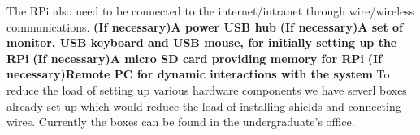 \documentclass{article}
\begin{document}
The RPi also need to be connected to the internet/intranet through wire/wireless communications. \newline\newline
\textbf{(If necessary)A power USB hub}\newline
\textbf{(If necessary)A set of monitor, USB keyboard and USB mouse, for initially setting up the RPi}\newline
\textbf{(If necessary)A micro SD card providing memory for RPi}\newline
\textbf{(If necessary)Remote PC for dynamic interactions with the system}\newline\newline
To reduce the load of setting up various hardware components we have severl boxes already set up which would reduce the load of installing shields and connecting wires. Currently the boxes can be found in the undergraduate's office. 
\end{document}
